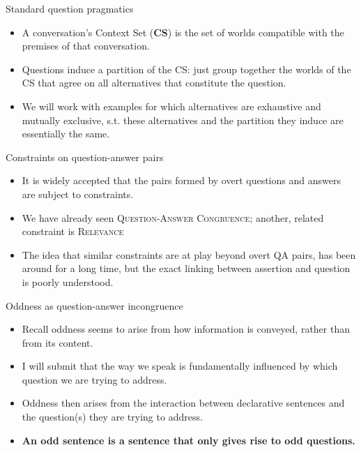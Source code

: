 \documentclass[10pt]{beamer}
\begin{document}
\begin{frame}{Standard question pragmatics}
	\begin{itemize}
		\item A conversation's Context Set (\textbf{CS}) is the set of worlds compatible with the premises of that conversation.
		\item Questions induce a partition of the CS: just group together the worlds of the CS that agree on all alternatives that constitute the question.
		\item We will work with examples for which alternatives are exhaustive and mutually exclusive, s.t. these alternatives and the partition they induce are essentially the same.
	\end{itemize}
\end{frame}
\begin{frame}{Constraints on question-answer pairs}
	\begin{itemize}
		\item It is widely accepted that the pairs formed by overt questions and answers are subject to constraints.
		\item We have already seen \textsc{Question-Answer Congruence}; another, related constraint is \textsc{Relevance} 
		\begin{exe}
		\end{exe}
		\item The idea that similar constraints are at play beyond overt QA pairs, has been around for a long time, but the exact linking between assertion and question is poorly understood.
	\end{itemize}
\end{frame}
\begin{frame}{Oddness as question-answer incongruence}
	\begin{itemize}
		\item Recall oddness seems to arise from how information is conveyed, rather than from its content.
		\item I will submit that the way we speak is fundamentally influenced by which question we are trying to address.
		\item Oddness then arises from the interaction between declarative sentences and the question(s) they are trying to address.
		\item \textbf{An odd sentence is a sentence that only gives rise to odd questions.}
	\end{itemize}
\end{frame}
\end{document}
